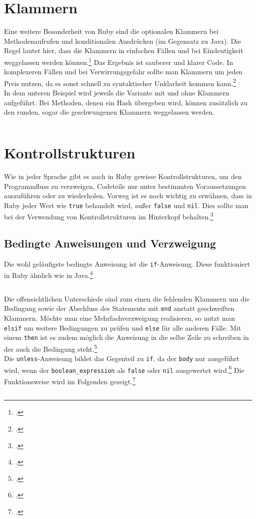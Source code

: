 \documentclass[a4paper, 11pt]{scrreprt}
\begin{document}
\section{Klammern}
Eine weitere Besonderheit von Ruby sind die optionalen Klammern bei Methodenaufrufen und konditionalen Ausdrücken (im Gegensatz zu Java). Die Regel lautet hier, dass die Klammern in einfachen Fällen und bei Eindeutigkeit weggelassen werden können.\footcite[vgl.][S.124]{p_ruby} Das Ergebnis ist sauberer und klarer Code. In komplexeren Fällen und bei Verwirrungsgefahr sollte man Klammern um jeden Preis nutzen, da es sonst schnell zu syntaktischer Unklarheit kommen kann.\footcite[vgl.][S.183]{ruby_lang}\\
In dem unteren Beispiel wird jeweils die Variante mit und ohne Klammern aufgeführt. Bei Methoden, denen ein Hash übergeben wird, können zusätzlich zu den runden, sogar die geschwungenen Klammern weggelassen werden.

\inputminted[]{ruby}{klammern.rb}


\section{Kontrollstrukturen}
Wie in jeder Sprache gibt es auch in Ruby gewisse Kontrollstrukturen, um den Programmfluss zu verzweigen, Codeteile nur unter bestimmten Voraussetzungen auszuführen oder zu wiederholen. Vorweg ist es noch wichtig zu erwähnen, dass in Ruby jeder Wert wie \texttt{true} behandelt wird, außer \texttt{false} und \texttt{nil}. Dies sollte man bei der Verwendung von Kontrollstrukturen im Hinterkopf behalten.\footcite[vgl.][S.11]{ruby_lang}

\subsection{Bedingte Anweisungen und Verzweigung}
Die wohl geläufigste bedingte Anweisung ist die \texttt{if}-Anweisung. Diese funktioniert in Ruby ähnlich wie in Java.\footcite[vgl.][S.337]{p_ruby}
\inputminted[]{ruby}{if1.rb}
Die offensichtlichen Unterschiede sind zum einen die fehlenden Klammern um die Bedingung sowie der Abschluss des Statements mit \texttt{end} anstatt geschweiften Klammern. Möchte man eine Mehrfachverzweigung realisieren, so nutzt man \texttt{elsif} um weitere Bedingungen zu prüfen und \texttt{else} für alle anderen Fälle. Mit einem \texttt{then} ist es zudem möglich die Anweisung in die selbe Zeile zu schreiben in der auch die Bedingung steht.\footcite[vgl.][S.118-122]{ruby_lang}\\
Die \texttt{unless}-Anweisung bildet das Gegenteil zu \texttt{if}, da der \texttt{body} nur ausgeführt wird, wenn der \texttt{boolean\_expression} als \texttt{false} oder \texttt{nil} ausgewertet wird.\footcite[vgl.][S.122-123]{ruby_lang}
Die Funktionsweise wird im Folgenden gezeigt.\footcite[vgl.][S.337]{p_ruby}
\inputminted[]{ruby}{unless.rb}
\end{document}
